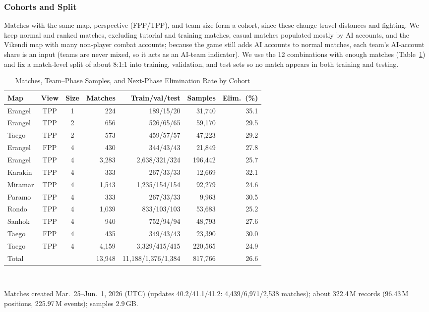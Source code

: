 \documentclass[conference]{IEEEtran}
\begin{document}
\subsubsection{Cohorts and Split}
\label{sec:method:cohort}
Matches with the same map, perspective (FPP/TPP), and team size form a cohort, since these change travel distances and fighting.
We keep normal and ranked matches, excluding tutorial and training matches, casual matches populated mostly by AI accounts, and the Vikendi map with many non-player combat accounts; because the game still adds AI accounts to normal matches, each team's AI-account share is an input (teams are never mixed, so it acts as an AI-team indicator).
We use the 12 combinations with enough matches (Table~\ref{tab:cohorts}) and fix a match-level split of about 8:1:1 into training, validation, and test sets so no match appears in both training and testing.

\begin{table}[t]
\centering
\caption{Matches, Team--Phase Samples, and Next-Phase Elimination Rate by Cohort}
\label{tab:cohorts}
\footnotesize
\setlength{\tabcolsep}{2.7pt}
\begin{tabular}{lccrrrr}
\hline
Map & View & Size & Matches & Train/val/test & Samples & Elim.\ (\%) \\
\hline
Erangel & TPP & 1 & 224 & 189/15/20 & 31,740 & 35.1 \\
Erangel & TPP & 2 & 656 & 526/65/65 & 59,170 & 29.5 \\
Taego & TPP & 2 & 573 & 459/57/57 & 47,223 & 29.2 \\
Erangel & FPP & 4 & 430 & 344/43/43 & 21,849 & 27.8 \\
Erangel & TPP & 4 & 3,283 & 2,638/321/324 & 196,442 & 25.7 \\
Karakin & TPP & 4 & 333 & 267/33/33 & 12,669 & 32.1 \\
Miramar & TPP & 4 & 1,543 & 1,235/154/154 & 92,279 & 24.6 \\
Paramo & TPP & 4 & 333 & 267/33/33 & 9,963 & 30.5 \\
Rondo & TPP & 4 & 1,039 & 833/103/103 & 53,683 & 25.2 \\
Sanhok & TPP & 4 & 940 & 752/94/94 & 48,793 & 27.6 \\
Taego & FPP & 4 & 435 & 349/43/43 & 23,390 & 30.0 \\
Taego & TPP & 4 & 4,159 & 3,329/415/415 & 220,565 & 24.9 \\
\hline
Total & & & 13,948 & 11,188/1,376/1,384 & 817,766 & 26.6 \\
\hline
\end{tabular}
\\[2pt]
\parbox{\columnwidth}{\scriptsize Matches created Mar.~25--Jun.~1, 2026 (UTC) (updates 40.2/41.1/41.2: 4,439/6,971/2,538 matches); about 322.4\,M records (96.43\,M positions, 225.97\,M events); samples 2.9\,GB.}
\end{table}
\end{document}
